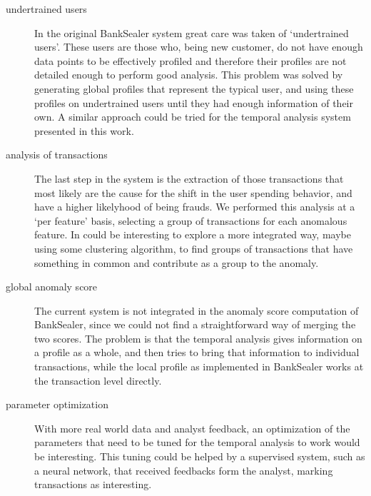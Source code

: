 \begin{description}
\item[undertrained users] In the original BankSealer system great care was taken of `undertrained users'. These users are those who, being new customer, do not have enough data points to be effectively profiled and therefore their profiles are not detailed enough to perform good analysis. This problem was solved by generating global profiles that represent the typical user, and using these profiles on undertrained users until they had enough information of their own. A similar approach could be tried for the temporal analysis system presented in this work.
\item[analysis of transactions] The last step in the system is the extraction of those transactions that most likely are the cause for the shift in the user spending behavior, and have a higher likelyhood of being frauds. We performed this analysis at a `per feature' basis, selecting a group of transactions for each anomalous feature. In could be interesting to explore a more integrated way, maybe using some clustering algorithm, to find groups of transactions that have something in common and contribute as a group to the anomaly.
\item[global anomaly score] The current system is not integrated in the anomaly score computation of BankSealer, since we could not find a straightforward way of merging the two scores. The problem is that the temporal analysis gives information on a profile as a whole, and then tries to bring that information to individual transactions, while the local profile as implemented in BankSealer works at the transaction level directly.
\item[parameter optimization] With more real world data and analyst feedback, an optimization of the parameters that need to be tuned for the temporal analysis to work would be interesting. This tuning could be helped by a supervised system, such as a neural network, that received feedbacks form the analyst, marking transactions as interesting.
\end{description}
